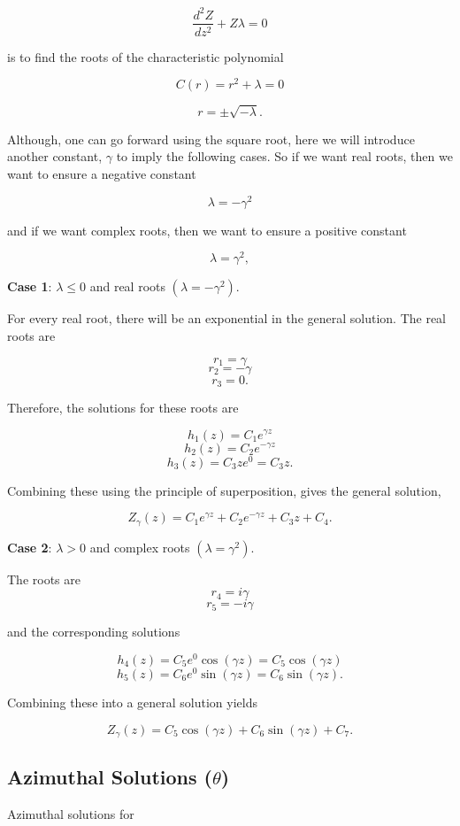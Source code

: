 \documentclass[12pt]{article}
\begin{document}
$$\frac{d^2 Z}{dz^2} + Z \lambda = 0$$

is to find the roots of the characteristic polynomial

$$C(r) = r^2 + \lambda = 0$$

$$r =  \pm \sqrt{ -\lambda}.$$

Although, one can go forward using the square root, here we will introduce another constant, $\gamma$ to imply
the following cases.  So if we want real roots, then we want to ensure a negative constant

$$ \lambda = -\gamma^2 $$

and if we want complex roots, then we want to ensure a positive constant

$$ \lambda = \gamma^2 ,$$

{\bf Case 1}: $\lambda \le 0$ and real roots $(\lambda = -\gamma^2)$.

For every real root, there will be an exponential in the general solution.  The real roots are

$$ r_1 = \gamma $$
$$ r_2 = -\gamma $$
$$ r_3 = 0 .$$

Therefore, the solutions for these roots are

$$ h_1(z) = C_1e^{\gamma z} $$
$$ h_2(z) = C_2e^{-\gamma z} $$
$$ h_3(z) = C_3z e^0  = C_3z.$$

Combining these using the principle of superposition, gives the general solution,

\begin{equation}
Z_{\gamma}(z) =  C_1e^{\gamma z} + C_2e^{-\gamma z} + C_3z + C_4.
\end{equation}

{\bf Case 2}: $\lambda > 0$ and complex roots $(\lambda = \gamma^2)$.

The roots are
$$ r_4 = i \gamma $$
$$ r_5 = -i \gamma $$

and the corresponding solutions

$$ h_4(z) = C_5e^0 \cos (\gamma z) =  C_5\cos (\gamma z) $$
$$ h_5(z) = C_6e^0 \sin (\gamma z)=  C_6\sin (\gamma z) .$$

Combining these into a general solution yields

$$Z_{\gamma}(z) =  C_5\cos (\gamma z) + C_6\sin (\gamma z) + C_7.$$

\subsection{Azimuthal Solutions ($\theta$)}

Azimuthal solutions for
\end{document}
